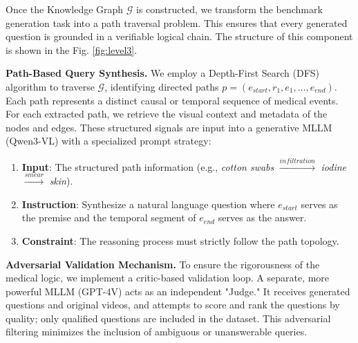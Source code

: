 
Once the Knowledge Graph $\mathcal{G}$ is constructed, we transform the benchmark generation task into a path traversal problem. This ensures that every generated question is grounded in a verifiable logical chain. The structure of this component is shown in the Fig. \ref{fig:level3}.

\textbf{Path-Based Query Synthesis.}
We employ a Depth-First Search (DFS) algorithm to traverse $\mathcal{G}$, identifying directed paths $p = (e_{start}, r_1, e_1, \dots, e_{end})$. Each path represents a distinct causal or temporal sequence of medical events.
For each extracted path, we retrieve the visual context and metadata of the nodes and edges. These structured signals are input into a generative MLLM (Qwen3-VL\cite{qwen3vl}) with a specialized prompt strategy:
\begin{enumerate}
    \item \textbf{Input}: The structured path information (e.g., \textit{cotton swabs} $\xrightarrow{infiltration}$ \textit{iodine} $\xrightarrow{smear}$ \textit{skin}).
    \item \textbf{Instruction}: Synthesize a natural language question where $e_{start}$ serves as the premise and the temporal segment of $e_{end}$ serves as the answer.
    \item \textbf{Constraint}: The reasoning process must strictly follow the path topology.
\end{enumerate}

\textbf{Adversarial Validation Mechanism.}
To ensure the rigorousness of the medical logic, we implement a critic-based validation loop. A separate, more powerful MLLM (GPT-4V\cite{GPT4V}) acts as an independent "Judge." 
It receives generated questions and original videos, and attempts to score and rank the questions by quality; only qualified questions are included in the dataset.
This adversarial filtering minimizes the inclusion of ambiguous or unanswerable queries.
